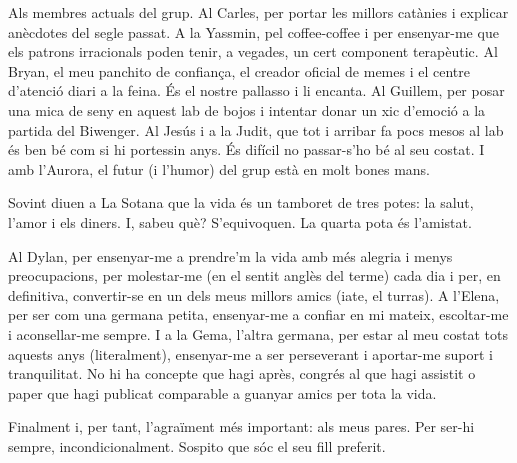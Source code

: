 Als membres actuals del grup. Al Carles, per portar les millors catànies i explicar anècdotes del segle passat. A la Yassmin, pel coffee-coffee i per ensenyar-me que els patrons irracionals poden tenir, a vegades, un cert component terapèutic. Al Bryan, el meu panchito de confiança, el creador oficial de memes i el centre d’atenció diari a la feina. És el nostre pallasso i li encanta. Al Guillem, per posar una mica de seny en aquest lab de bojos i intentar donar un xic d’emoció a la partida del Biwenger. Al Jesús i a la Judit, que tot i arribar fa pocs mesos al lab és ben bé com si hi portessin anys. És difícil no passar-s’ho bé al seu costat. I amb l’Aurora, el futur (i l’humor) del grup està en molt bones mans.

Sovint diuen a La Sotana que la vida és un tamboret de tres potes: la salut, l’amor i els diners. I, sabeu què? S’equivoquen. La quarta pota és l’amistat. 

Al Dylan, per ensenyar-me a prendre’m la vida amb més alegria i menys preocupacions, per molestar-me (en el sentit anglès del terme) cada dia i per, en definitiva, convertir-se en un dels meus millors amics (iate, el turras). A l’Elena, per ser com una germana petita, ensenyar-me a confiar en mi mateix, escoltar-me i aconsellar-me sempre. I a la Gema, l’altra germana, per estar al meu costat tots aquests anys (literalment), ensenyar-me a ser perseverant i aportar-me suport i tranquilitat. No hi ha concepte que hagi après, congrés al que hagi assistit o paper que hagi publicat comparable a guanyar amics per tota la vida. 

Finalment i, per tant, l’agraïment més important: als meus pares. Per ser-hi sempre, incondicionalment. Sospito que sóc el seu fill preferit.

 